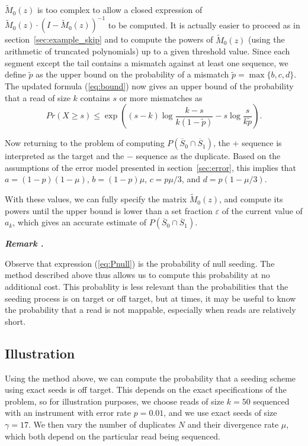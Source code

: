 \documentclass{article}
\newcounter{remarkcounter}
\newenvironment{remark}
{\small\it\vspace{0.5\baselineskip}
  \refstepcounter{remarkcounter}%
  \noindent\textbf{Remark \arabic{remarkcounter}.}%
}{\vspace{0.5\baselineskip}}
\begin{document}
$\tilde{M}_0(z)$ is too complex to allow a closed expression of
$\tilde{M}_0(z)\cdot(I-\tilde{M}_0(z))^{-1}$ to be computed. It is
actually easier to proceed as in section~\ref{sec:example_skip} and to
compute the powers of $\tilde{M}_0(z)$ (using the arithmetic of truncated
polynomials) up to a given threshold value. Since each segment except the
tail contains a mismatch against at least one sequence, we define
$\tilde{p}$ as the upper bound on the probability of a mismatch $\tilde{p}
= \max\{b,c,d\}$. The updated formula (\ref{eq:bound}) now gives an upper
bound of the probability that a read of size $k$ contains $s$ or more
mismatches as
\begin{equation*}
Pr(X \geq s) \leq \exp \left( (s-k)\log \frac{k-s}{k(1-\tilde{p})} -s\log
\frac{s}{k\tilde{p}} \right).
\end{equation*}

Now returning to the problem of computing $P(\overline{S}_0 \cap
\overline{S}_1)$, the $+$ sequence is interpreted as the target and the
$-$ sequence as the duplicate. Based on the assumptions of the error model
presented in section~\ref{sec:error}, this implies that $a =
(1-p)(1-\mu)$, $b = (1-p)\mu$, $c = p\mu/3$, and $d = p(1-\mu/3)$.

With these values, we can fully specify the matrix $\tilde{M}_0(z)$, and
compute its powers until the upper bound is lower than a set fraction
$\varepsilon$ of the current value of $a_k$, which gives an accurate
estimate of $P(\overline{S}_0 \cap \overline{S}_1)$.


\begin{remark}
Observe that expression (\ref{eq:Pnull}) is the probability of null
seeding. The method described above thus allows us to compute this
probability at no additional cost. This probablity is less relevant than
the probabilities that the seeding process is on target or off target, but
at times, it may be useful to know the probability that a read is
not mappable, especially when reads are relatively short.
\end{remark}


\subsection{Illustration}
\label{sec:illdual}

Using the method above, we can compute the probability that a seeding
scheme using exact seeds is off target. This depends on the exact
specifications of the problem, so for illustration purposes, we choose
reads of size $k=50$ sequenced with an instrument with error rate
$p=0.01$, and we use exact seeds of size $\gamma=17$. We then vary the
number of duplicates $N$ and their divergence rate $\mu$, which both
depend on the particular read being sequenced.
\end{document}
